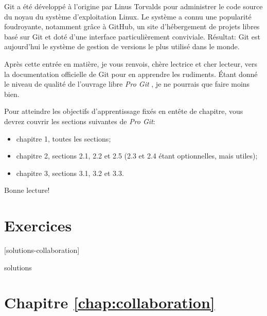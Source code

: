 Git a été développé à l'origine par Linus Torvalds pour
administrer le code source du noyau du système d'exploitation Linux.
Le système a connu une popularité foudroyante, notamment grâce à
GitHub, un site d'hébergement de projets libres basé sur Git et doté
d'une interface particulièrement conviviale. Résultat: Git est
aujourd'hui le système de gestion de versions le plus utilisé dans le
monde.

Après cette entrée en matière, je vous renvois, chère lectrice et cher
lecteur, vers la documentation officielle de Git pour en apprendre les
rudiments. Étant donné le niveau de qualité de l'ouvrage libre
\emph{Pro Git} \citep{ProGit:2e:2014}, je ne pourrais que faire moins
bien.

Pour atteindre les objectifs d'apprentissage fixés en entête de
chapitre, vous devrez couvrir les sections suivantes de \emph{Pro Git}:
\begin{itemize}
\item chapitre 1, toutes les sections;
\item chapitre 2, sections 2.1, 2.2 et 2.5 (2.3 et 2.4 étant
  optionnelles, mais utiles);
\item chapitre 3, sections 3.1, 3.2 et 3.3.
\end{itemize}

Bonne lecture!



% 


\section{Exercices}
\label{sec:collaboration:exercices}

[solutions-collaboration]

\begin{Filesave}{solutions}
\section*{Chapitre \ref*{chap:collaboration}}

\end{Filesave}

